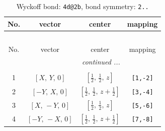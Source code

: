 \documentclass[fleqn,8pt]{jsarticle}
\begin{document}
\renewcommand{\arraystretch}{1.2}
\begin{longtable}{cccc}
\caption{Wyckoff bond: {\tt 4d@2b}, bond symmetry: {\tt 2..}}
 \\
 \hline \hline
No. & vector & center & mapping \\ \hline \endfirsthead

\multicolumn{3}{l}{\tablename\ \thetable{}} \\
 \hline \hline
No. & vector & center & mapping \\ \hline \endhead

 \hline \hline
\multicolumn{3}{r}{\footnotesize\it continued ...} \\ \endfoot

 \hline \hline
\multicolumn{3}{r}{} \\ \endlastfoot

1 & $\left[ X,\, Y,\, 0 \right]$ & $\left[ \frac{1}{2},\, \frac{1}{2},\, z \right]$ & {\tt [1,-2]} \\ \hline
2 & $\left[ - Y,\, X,\, 0 \right]$ & $\left[ \frac{1}{2},\, \frac{1}{2},\, z + \frac{1}{2} \right]$ & {\tt [3,-4]} \\ \hline
3 & $\left[ X,\, - Y,\, 0 \right]$ & $\left[ \frac{1}{2},\, \frac{1}{2},\, z \right]$ & {\tt [5,-6]} \\ \hline
4 & $\left[ - Y,\, - X,\, 0 \right]$ & $\left[ \frac{1}{2},\, \frac{1}{2},\, z + \frac{1}{2} \right]$ & {\tt [7,-8]} \\
\end{longtable}
\renewcommand{\arraystretch}{1.2}
\end{document}
